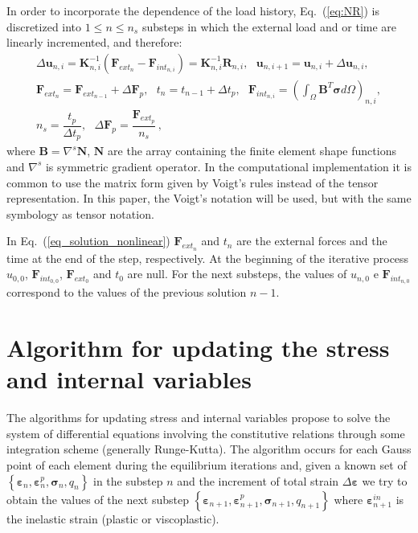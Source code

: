 \documentclass[Journal,letterpaper]{ascelike-new}
\newcommand{\Bll}{\boldsymbol B}
\newcommand{\Kll}{\boldsymbol K}
\newcommand{\Fl}{\boldsymbol{F}}
\newcommand{\Nll}{\boldsymbol N}
\newcommand{\Rl}{\boldsymbol{R}}
\newcommand{\ul}{\boldsymbol u}
\newcommand{\strain}{\boldsymbol{\varepsilon}}
\newcommand{\stress}{\boldsymbol{\sigma}}
\begin{document}
In order to incorporate the dependence of the load history, Eq.~(\ref{eq:NR}) is discretized into $1 \leq n \leq n_s$ substeps in which the external load and or time are linearly incremented, and therefore:
\begin{equation} \label{eq_solution_nonlinear}
	\begin{array}{lcl}
		\Delta \ul_{n,i} = \Kll_{n,i}^{-1}\left(\Fl_{ext_{n}} - \Fl_{int_{n,i}} \right) = \Kll_{n,i}^{-1}\Rl_{n,i}, ~~~ \ul_{n,i+1} = \ul_{n,i}+\Delta\ul_{n,i}, \\ 
		 	\Fl_{ext_{n}} = \Fl_{ext_{n-1}} + \Delta \Fl_{p}, ~~~ t_{n} = t_{n-1} + \Delta t_p, ~~~ \Fl_{int_{n,i}} = \left( \int_{\Omega} \Bll^T \stress d\Omega \right)_{n,i}, \\
		 	n_s = \dfrac{t_p}{\Delta t_p},~~~ \Delta \Fl_{p} = \dfrac{\Fl_{ext_p}}{n_s} \,,
	\end{array}
\end{equation}
where $\Bll = \nabla^s \Nll$, $\Nll$ are the array containing the finite element shape functions and $\nabla^s$ is symmetric gradient operator. In the computational implementation it is common to use the matrix form given by Voigt’s rules \cite{belytschko2000} instead of the tensor representation. In this paper, the Voigt’s notation will be used, but with the same symbology as tensor notation.

In Eq.~(\ref{eq_solution_nonlinear}) $\Fl_{ext_n}$ and $t_n$ are the external forces and the time at the end of the step, respectively. At the beginning of the iterative process $u_{0,0}$, $\Fl_{int_{0,0}}$, $\Fl_{ext_0}$ and $t_0$ are null. For the next substeps, the values of $u_{n,0}$ e $\Fl_{int_{n,0}}$ correspond to the values of the previous solution $n-1$. 

\section{Algorithm for updating the stress and internal variables}

The algorithms for updating stress and internal variables propose to solve the system of differential equations involving the constitutive relations through some integration scheme (generally Runge-Kutta). The algorithm occurs for each Gauss point of each element during the equilibrium iterations and, given a known set of $\left\{ \strain_n, \strain_n^p,\stress_n,q_n \right\}$ in the substep $n$ and the increment of total strain $\Delta \strain$ we try to obtain the values of the next substep $\left\{ \strain_{n+1}, \strain_{n+1}^p,\stress_{n+1},q_{n+1} \right\}$ where $\strain_{n+1}^{in}$ is the inelastic strain (plastic or viscoplastic).
\end{document}
